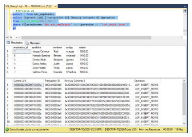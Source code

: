 \begin{enumerate}[1.]
	\begin{center}
	\includegraphics[width=10cm]{./Imagenes/1ejer22} 
	\end{center}
\end{enumerate} 
